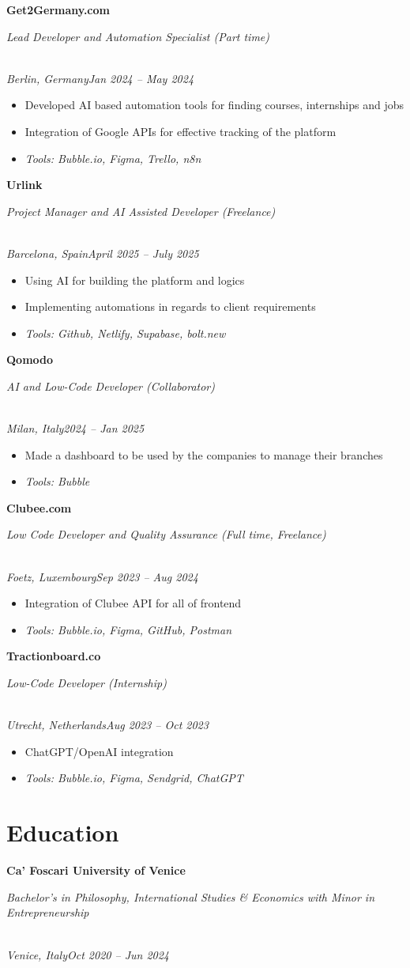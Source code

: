 \documentclass[a4paper,10pt]{article}
\newcommand{\role}[4]{\vspace{3pt}\noindent\hspace{0.6em}\parbox[t]{0.38\textwidth}{\raggedright\textbf{#1}}\hfill\parbox[t]{0.58\textwidth}{\raggedleft\textit{#2}}\\{\textit{#3}\hfill\textit{#4}}\vspace{1pt}}
\begin{document}
\role{Get2Germany.com}{Lead Developer and Automation Specialist (Part time)}{Berlin, Germany}{Jan 2024 -- May 2024}
\begin{itemize}
\item Developed AI based automation tools for finding courses, internships and jobs
\item Integration of Google APIs for effective tracking of the platform
\item \textit{Tools: Bubble.io, Figma, Trello, n8n}
\end{itemize}

\role{Urlink}{Project Manager and AI Assisted Developer (Freelance)}{Barcelona, Spain}{April 2025 -- July 2025}
\begin{itemize}
\item Using AI for building the platform and logics
\item Implementing automations in regards to client requirements
\item \textit{Tools: Github, Netlify, Supabase, bolt.new}
\end{itemize}

\role{Qomodo}{AI and Low-Code Developer (Collaborator)}{Milan, Italy}{2024 -- Jan 2025}
\begin{itemize}
\item Made a dashboard to be used by the companies to manage their branches
\item \textit{Tools: Bubble}
\end{itemize}

\role{Clubee.com}{Low Code Developer and Quality Assurance (Full time, Freelance)}{Foetz, Luxembourg}{Sep 2023 -- Aug 2024}
\begin{itemize}
\item Integration of Clubee API for all of frontend
\item \textit{Tools: Bubble.io, Figma, GitHub, Postman}
\end{itemize}

\role{Tractionboard.co}{Low-Code Developer (Internship)}{Utrecht, Netherlands}{Aug 2023 -- Oct 2023}
\begin{itemize}
\item ChatGPT/OpenAI integration
\item \textit{Tools: Bubble.io, Figma, Sendgrid, ChatGPT}
\end{itemize}

\section{Education}
\role{Ca' Foscari University of Venice}{Bachelor's in Philosophy, International Studies \& Economics with Minor in Entrepreneurship}{Venice, Italy}{Oct 2020 -- Jun 2024}
\end{document}
